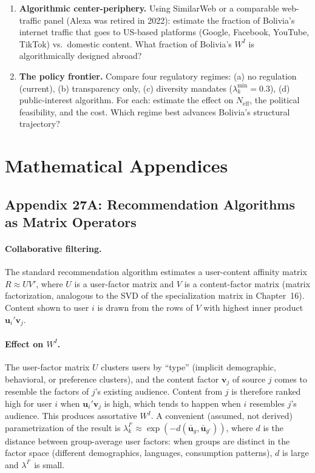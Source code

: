 \documentclass[../structural_economics_book.tex]{subfiles}
\begin{document}
\begin{enumerate}[label=\textbf{27.\arabic*}, leftmargin=3em]
\item \textbf{Algorithmic center-periphery.} Using SimilarWeb or a comparable web-traffic panel (Alexa was retired in 2022): estimate the fraction of Bolivia's internet traffic that goes to US-based platforms (Google, Facebook, YouTube, TikTok) vs.\ domestic content. What fraction of Bolivia's $W^I$ is algorithmically designed abroad?

\item \textbf{The policy frontier.} Compare four regulatory regimes: (a) no regulation (current), (b) transparency only, (c) diversity mandates ($\lambda_k^{\min} = 0.3$), (d) public-interest algorithm. For each: estimate the effect on $N_{\text{eff}}$, the political feasibility, and the cost. Which regime best advances Bolivia's structural trajectory?
\end{enumerate}


\newpage
\section*{Mathematical Appendices}


\subsection*{Appendix 27A: Recommendation Algorithms as Matrix Operators}
\label{ch27:app:algorithms}

\paragraph{Collaborative filtering.} The standard recommendation algorithm estimates a user-content affinity matrix $R \approx UV'$, where $U$ is a user-factor matrix and $V$ is a content-factor matrix (matrix factorization, analogous to the SVD of the specialization matrix in Chapter~16). Content shown to user $i$ is drawn from the rows of $V$ with highest inner product $\mathbf{u}_i' \mathbf{v}_j$.

\paragraph{Effect on $W^I$.} The user-factor matrix $U$ clusters users by ``type'' (implicit demographic, behavioral, or preference clusters), and the content factor $\mathbf{v}_j$ of source $j$ comes to resemble the factors of $j$'s existing audience. Content from $j$ is therefore ranked high for user $i$ when $\mathbf{u}_i'\mathbf{v}_j$ is high, which tends to happen when $i$ resembles $j$'s audience. This produces assortative $W^I$. A convenient (assumed, not derived) parametrization of the result is $\lambda_k^{I'} \approx \exp(-d(\bar{\mathbf{u}}_g, \bar{\mathbf{u}}_{g'}))$, where $d$ is the distance between group-average user factors: when groups are distinct in the factor space (different demographics, languages, consumption patterns), $d$ is large and $\lambda^{I'}$ is small.
\end{document}
